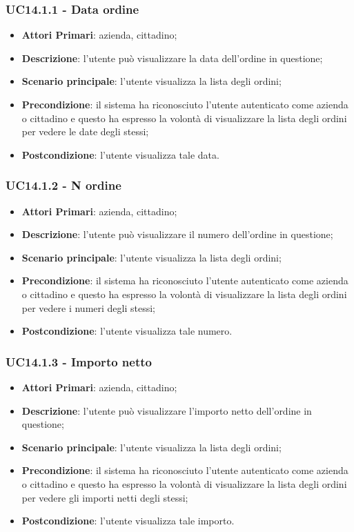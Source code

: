 \subsubsection{UC14.1.1 - Data ordine}
\begin{itemize}
	\item \textbf{Attori Primari}: azienda, cittadino;
	\item \textbf{Descrizione}: l'utente può visualizzare la data dell'ordine in questione;
	\item \textbf{Scenario principale}: l'utente visualizza la lista degli ordini;
	\item \textbf{Precondizione}: il sistema ha riconosciuto l'utente autenticato come azienda o cittadino e questo ha espresso la volontà di visualizzare la lista degli ordini per vedere le date degli stessi;
	\item \textbf{Postcondizione}: l'utente visualizza tale data.
\end{itemize}

\subsubsection{UC14.1.2 - N ordine}
\begin{itemize}
	\item \textbf{Attori Primari}: azienda, cittadino;
	\item \textbf{Descrizione}: l'utente può visualizzare il numero dell'ordine in questione;
	\item \textbf{Scenario principale}: l'utente visualizza la lista degli ordini;
	\item \textbf{Precondizione}: il sistema ha riconosciuto l'utente autenticato come azienda o cittadino e questo ha espresso la volontà di visualizzare la lista degli ordini per vedere i numeri degli stessi;
	\item \textbf{Postcondizione}: l'utente visualizza tale numero.
\end{itemize}

\subsubsection{UC14.1.3 - Importo netto}
\begin{itemize}
	\item \textbf{Attori Primari}: azienda, cittadino;
	\item \textbf{Descrizione}: l'utente può visualizzare l'importo netto dell'ordine in questione;
	\item \textbf{Scenario principale}: l'utente visualizza la lista degli ordini;
	\item \textbf{Precondizione}: il sistema ha riconosciuto l'utente autenticato come azienda o cittadino e questo ha espresso la volontà di visualizzare la lista degli ordini per vedere gli importi netti degli stessi;
	\item \textbf{Postcondizione}: l'utente visualizza tale importo.
\end{itemize}

